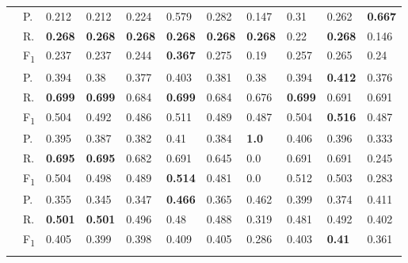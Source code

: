\begin{tabularx}{\textwidth}{p{1.3em}l Z  Z  Z  Z  Z  Z  Z  Z  Z }
    & P.    & 0.212    & 0.212    & 0.224    & 0.579    & 0.282    & 0.147    & 0.31    & 0.262    & \textbf{ 0.667 } \\
    & R.    & \textbf{ 0.268 }    & \textbf{ 0.268 }    & \textbf{ 0.268 }    & \textbf{ 0.268 }    & \textbf{ 0.268 }    & \textbf{ 0.268 }    & 0.22    & \textbf{ 0.268 }    & 0.146 \\
    & F\textsubscript{1}    & 0.237    & 0.237    & 0.244    & \textbf{ 0.367 }    & 0.275    & 0.19    & 0.257    & 0.265    & 0.24 \\
     \midrule {}

    & P.    & 0.394    & 0.38    & 0.377    & 0.403    & 0.381    & 0.38    & 0.394    & \textbf{ 0.412 }    & 0.376 \\
    & R.    & \textbf{ 0.699 }    & \textbf{ 0.699 }    & 0.684    & \textbf{ 0.699 }    & 0.684    & 0.676    & \textbf{ 0.699 }    & 0.691    & 0.691 \\
    & F\textsubscript{1}    & 0.504    & 0.492    & 0.486    & 0.511    & 0.489    & 0.487    & 0.504    & \textbf{ 0.516 }    & 0.487 \\
     \midrule {}

    & P.    & 0.395    & 0.387    & 0.382    & 0.41    & 0.384    & \textbf{ 1.0 }    & 0.406    & 0.396    & 0.333 \\
    & R.    & \textbf{ 0.695 }    & \textbf{ 0.695 }    & 0.682    & 0.691    & 0.645    & 0.0    & 0.691    & 0.691    & 0.245 \\
    & F\textsubscript{1}    & 0.504    & 0.498    & 0.489    & \textbf{ 0.514 }    & 0.481    & 0.0    & 0.512    & 0.503    & 0.283 \\
     \midrule {}

    & P.    & 0.355    & 0.345    & 0.347    & \textbf{ 0.466 }    & 0.365    & 0.462    & 0.399    & 0.374    & 0.411 \\
    & R.    & \textbf{ 0.501 }    & \textbf{ 0.501 }    & 0.496    & 0.48    & 0.488    & 0.319    & 0.481    & 0.492    & 0.402 \\
    & F\textsubscript{1}    & 0.405    & 0.399    & 0.398    & 0.409    & 0.405    & 0.286    & 0.403    & \textbf{ 0.41 }    & 0.361 \\
     \midrule {}

\end{tabularx}
